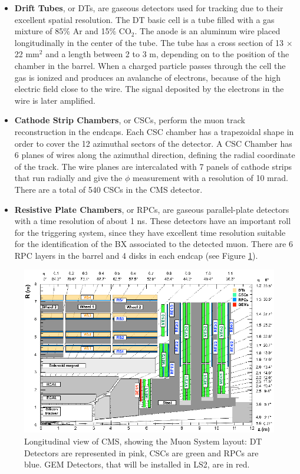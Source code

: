 \begin{itemize} 
 \item \textbf{Drift Tubes}, or DTs, are gaseous detectors used for tracking due to their excellent spatial resolution.
The DT basic cell is a tube filled with a gas mixture of 85$\%$ Ar and 15$\%$ CO$_{2}$.
The anode is an aluminum wire placed longitudinally in the center of the tube.
The tube has a cross section of 13 $\times$ 22 mm$^{2}$ and a length between 2 to 3 m,
depending on to the position of the chamber in the barrel. When a charged particle passes through the cell 
the gas is ionized and produces an avalanche of electrons, because of the high 
electric field close to the wire. The signal deposited by the electrons in the wire is later amplified. 
 \item \textbf{Cathode Strip Chambers}, or CSCs, perform the muon track reconstruction in the endcaps. Each CSC chamber
has a trapezoidal shape in order to cover the 12 azimuthal sectors of the detector. A CSC Chamber 
has 6 planes of wires along the azimuthal direction, defining the radial coordinate of the track. The wire
planes are intercalated with 7 panels of cathode strips that run radially and give the $\phi$ measurement 
with a resolution of 10 mrad. There are a total of 540 CSCs in the CMS detector. %
\item \textbf{Resistive Plate Chambers}, or RPCs, are gaseous parallel-plate detectors 
with a time resolution of about 1 ns. These detectors have an important roll for the triggering
system, since they have excellent time resolution suitable for the identification of the BX 
associated to the detected muon. There are 6 RPC layers in the barrel
and 4 disks in each endcap (see Figure \ref{figchp2:MuonSystem}). 
 \end{itemize}


\begin{center}
\begin{figure}[h]
\centering
\includegraphics[scale=0.4]{figuras/Chapter2/MuonSystem}
\caption{Longitudinal view of CMS, showing the Muon System layout: DT Detectors are represented in pink,
CSCs are green and RPCs are blue. GEM Detectors, that will be installed in LS2, are in red.}\label{figchp2:MuonSystem}
\end{figure}
\end{center}

